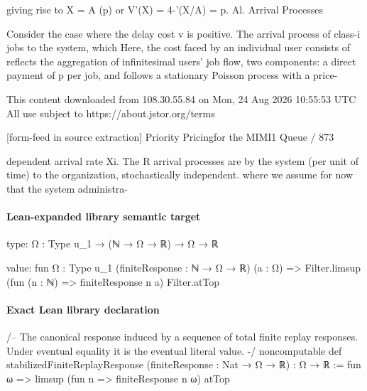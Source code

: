 \documentclass[10pt]{article}
\begin{document}
\begin{ReviewVerbatim}

giving rise to X = A (p) or V'(X) = 4-'(X/A) = p.                     Al. Arrival Processes

  Consider the case where the delay cost v is positive.               The arrival process of class-i jobs to the system, which
Here, the cost faced by an individual user consists of                reflects the aggregation of infinitesimal users' job flow,
two components: a direct payment of p per job, and                    follows a stationary Poisson process with a price-




                                                 This content downloaded from
                               108.30.55.84 on Mon, 24 Aug 2026 10:55:53 UTC
                                         All use subject to https://about.jstor.org/terms

[form-feed in source extraction]
                                                                                Priority Pricingfor the MIMI1 Queue / 873

dependent arrival rate Xi. The R arrival processes are                 by the system (per unit of time) to the organization,
stochastically independent.                                            where we assume for now that the system administra-
\end{ReviewVerbatim}



\paragraph{Lean-expanded library semantic target}
\begin{ReviewVerbatim}
type:
{Ω : Type u_1} → (ℕ → Ω → ℝ) → Ω → ℝ

value:
fun {Ω : Type u_1} (finiteResponse : ℕ → Ω → ℝ) (a : Ω) =>
  Filter.limsup (fun (n : ℕ) => finiteResponse n a) Filter.atTop
\end{ReviewVerbatim}

\paragraph{Exact Lean library declaration}
\begin{ReviewVerbatim}
/-- The canonical response induced by a sequence of total finite replay
responses.  Under eventual equality it is the eventual literal value. -/
noncomputable def stabilizedFiniteReplayResponse
    (finiteResponse : Nat → Ω → ℝ) : Ω → ℝ :=
  fun ω => limsup (fun n => finiteResponse n ω) atTop
\end{ReviewVerbatim}
\end{document}
